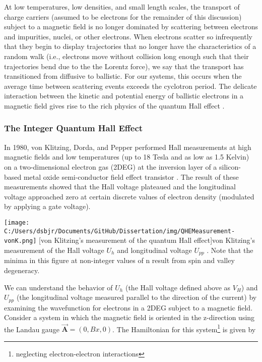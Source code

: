 At low temperatures, low densities, and small length scales, the transport of charge carriers (assumed to be electrons for the remainder of this discussion) subject to a magnetic field is no longer dominated by scattering between electrons and impurities, nuclei, or other electrons. When electrons scatter so infrequently that they begin to display trajectories that no longer have the characteristics of a random walk (i.e., electrons move without collision long enough such that their trajectories bend due to the the Lorentz force), we say that the transport has transitioned from diffusive to ballistic. For our systems, this occurs when the average time between scattering events exceeds the cyclotron period. The delicate interaction between the kinetic and potential energy of ballistic electrons in a magnetic field gives rise to the rich physics of the quantum Hall effect \cite{Beenakker1991}.

\subsubsection{The Integer Quantum Hall Effect}

In 1980, von Klitzing, Dorda, and Pepper performed Hall measurements at high magnetic fields and low temperatures (up to 18 Tesla and as low as 1.5 Kelvin) on a two-dimensional electron gas (2DEG) at the inversion layer of a silicon-based metal oxide semi-conductor field effect transistor \cite{VonKlitzing1980}. The result of these measurements showed that the Hall voltage plateaued and the longitudinal voltage approached zero at certain discrete values of electron density (modulated by applying a gate voltage).

\begin{centering}
\texttt{[image: C:/Users/dsbjr/Documents/GitHub/Dissertation/img/QHEMeasurement-vonK.png]}
  \captionsetup{width=0.75\textwidth}
  [von Klitzing's measurement of the quantum Hall effect]{von Klitzing's measurement of the Hall voltage $U_{h}$ and longitudinal voltage $U_{pp}$ \cite{VonKlitzing1980}. Note that the minima in this figure at non-integer values of n result from spin and valley degeneracy.}
  \label{fig:IQHE1}
\end{centering}

We can understand the behavior of $U_{h}$ (the Hall voltage defined above as $V_{H}$) and $U_{pp}$ (the longitudinal voltage measured parallel to the direction of the current) by examining the wavefunction for electrons in a 2DEG subject to a magnetic field. Consider a system in which the magnetic field is oriented in the z-direction using the Landau gauge $\vec{\mathbf{A}} = (0,Bx,0)$. The Hamiltonian for this system\footnote{neglecting electron-electron interactions} is given by

